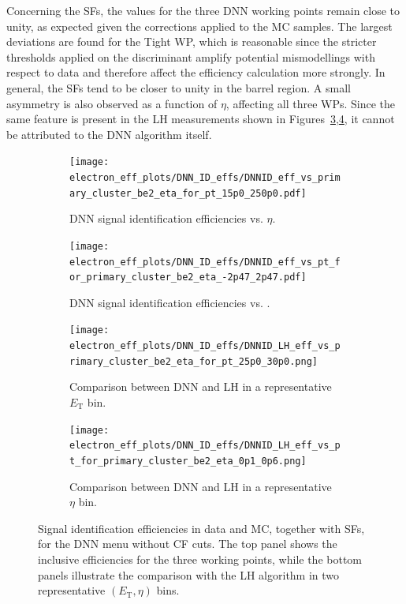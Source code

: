Concerning the SFs, the values for the three DNN working points remain close to unity, as expected given the corrections applied to the MC samples. The largest deviations are found for the Tight WP, which is reasonable since the stricter thresholds applied on the discriminant amplify potential mismodellings with respect to data and therefore affect the efficiency calculation more strongly. In general, the SFs tend to be closer to unity in the barrel region. A small asymmetry is also observed as a function of $\eta$, affecting all three WPs. Since the same feature is present in the LH measurements shown in Figures~\ref{fig:eff_dnn_lh_25_30},\ref{fig:eff_dnn_lh_0p1_0p6}, it cannot be attributed to the DNN algorithm itself.
\begin{figure}[htbp]
  \centering

  \begin{subfigure}{0.48\textwidth}
    \centering
    \texttt{[image: electron\_eff\_plots/DNN\_ID\_effs/DNNID\_eff\_vs\_primary\_cluster\_be2\_eta\_for\_pt\_15p0\_250p0.pdf]}
    \caption{DNN signal identification efficiencies vs. $\eta$.}
    \label{fig:eff_inclusive_pt_dnn_id}
  \end{subfigure}
  \hfill
  \begin{subfigure}{0.48\textwidth}
    \centering
    \texttt{[image: electron\_eff\_plots/DNN\_ID\_effs/DNNID\_eff\_vs\_pt\_for\_primary\_cluster\_be2\_eta\_-2p47\_2p47.pdf]}
    \caption{DNN signal identification efficiencies vs. \et.}
    \label{fig:eff_inclusive_eta_dnn_id}
  \end{subfigure}

  \vspace{0.6cm}

  \begin{subfigure}{0.48\textwidth}
    \centering
    \texttt{[image: electron\_eff\_plots/DNN\_ID\_effs/DNNID\_LH\_eff\_vs\_primary\_cluster\_be2\_eta\_for\_pt\_25p0\_30p0.png]}
    \caption{Comparison between DNN and LH in a representative $E_{\mathrm{T}}$ bin.}
    \label{fig:eff_dnn_lh_25_30}
  \end{subfigure}
  \hfill
  \begin{subfigure}{0.48\textwidth}
    \centering
    \texttt{[image: electron\_eff\_plots/DNN\_ID\_effs/DNNID\_LH\_eff\_vs\_pt\_for\_primary\_cluster\_be2\_eta\_0p1\_0p6.png]}
    \caption{Comparison between DNN and LH in a representative $\eta$ bin.}
    \label{fig:eff_dnn_lh_0p1_0p6}
  \end{subfigure}

  \caption{Signal identification efficiencies in data and MC, together with SFs, for the DNN menu without CF cuts. The top panel shows the inclusive efficiencies for the three working points, while the bottom panels illustrate the comparison with the LH algorithm in two representative $(E_{\mathrm{T}},\eta)$ bins.}
  \label{fig:eff_sfs_dnn_vs_lh}
\end{figure}


